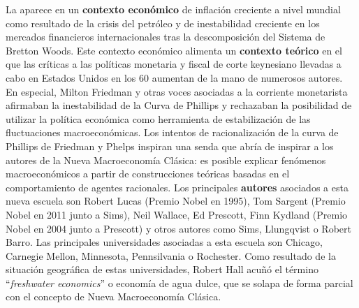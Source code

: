 \documentclass{nuevotema}
\begin{document}
La  aparece en un \textbf{contexto económico} de inflación creciente a nivel mundial como resultado de la crisis del petróleo y de inestabilidad creciente en los mercados financieros internacionales tras la descomposición del Sistema de Bretton Woods. Este contexto económico alimenta un \textbf{contexto teórico} en el que las críticas a las políticas monetaria y fiscal de corte keynesiano llevadas a cabo en Estados Unidos en los 60 aumentan de la mano de numerosos autores. En especial, Milton Friedman y otras voces asociadas a la corriente monetarista afirmaban la inestabilidad de la Curva de Phillips y rechazaban la posibilidad de utilizar la política económica como herramienta de estabilización de las fluctuaciones macroeconómicas. Los intentos de racionalización de la curva de Phillips de Friedman y Phelps inspiran una senda que abría de inspirar a los autores de la Nueva Macroeconomía Clásica: es posible explicar fenómenos macroeconómicos a partir de construcciones teóricas basadas en el comportamiento de agentes racionales. Los principales \textbf{autores} asociados a esta nueva escuela son Robert Lucas (Premio Nobel en 1995), Tom Sargent (Premio Nobel en 2011 junto a Sims), Neil Wallace, Ed Prescott,  Finn Kydland (Premio Nobel en 2004 junto a Prescott) y otros autores como Sims, Llungqvist o Robert Barro. Las principales universidades asociadas a esta escuela son Chicago, Carnegie Mellon, Minnesota, Pennsilvania o Rochester. Como resultado de la situación geográfica de estas universidades, Robert Hall acuñó el término ``\textit{freshwater economics}'' o economía de agua dulce, que se solapa de forma parcial con el concepto de Nueva Macroeconomía Clásica. 
\end{document}
